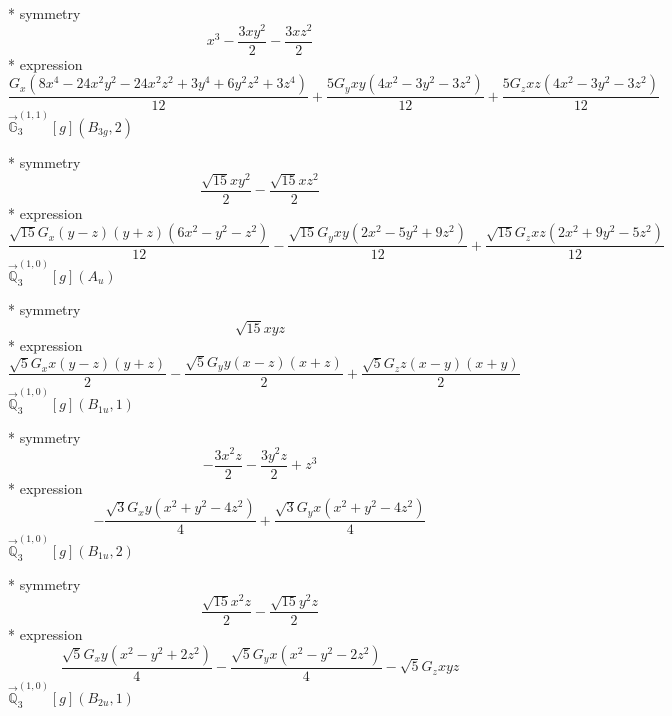 \documentclass[fleqn,8pt]{jsarticle}
\begin{document}
\noindent\quad ** symmetry
\begin{dmath*}
x^{3} - \frac{3 x y^{2}}{2} - \frac{3 x z^{2}}{2}
\end{dmath*}
\noindent\quad ** expression
\begin{dmath*}
\frac{G_{x} \left(8 x^{4} - 24 x^{2} y^{2} - 24 x^{2} z^{2} + 3 y^{4} + 6 y^{2} z^{2} + 3 z^{4}\right)}{12} + \frac{5 G_{y} x y \left(4 x^{2} - 3 y^{2} - 3 z^{2}\right)}{12} + \frac{5 G_{z} x z \left(4 x^{2} - 3 y^{2} - 3 z^{2}\right)}{12}
\end{dmath*}
\noindent\quad $\vec{\mathbb{G}}_{3}^{(1,1)}[g](B_{3g},2)$

\noindent\quad ** symmetry
\begin{dmath*}
\frac{\sqrt{15} x y^{2}}{2} - \frac{\sqrt{15} x z^{2}}{2}
\end{dmath*}
\noindent\quad ** expression
\begin{dmath*}
\frac{\sqrt{15} G_{x} \left(y - z\right) \left(y + z\right) \left(6 x^{2} - y^{2} - z^{2}\right)}{12} - \frac{\sqrt{15} G_{y} x y \left(2 x^{2} - 5 y^{2} + 9 z^{2}\right)}{12} + \frac{\sqrt{15} G_{z} x z \left(2 x^{2} + 9 y^{2} - 5 z^{2}\right)}{12}
\end{dmath*}
\noindent\quad $\vec{\mathbb{Q}}_{3}^{(1,0)}[g](A_{u})$

\noindent\quad ** symmetry
\begin{dmath*}
\sqrt{15} x y z
\end{dmath*}
\noindent\quad ** expression
\begin{dmath*}
\frac{\sqrt{5} G_{x} x \left(y - z\right) \left(y + z\right)}{2} - \frac{\sqrt{5} G_{y} y \left(x - z\right) \left(x + z\right)}{2} + \frac{\sqrt{5} G_{z} z \left(x - y\right) \left(x + y\right)}{2}
\end{dmath*}
\noindent\quad $\vec{\mathbb{Q}}_{3}^{(1,0)}[g](B_{1u},1)$

\noindent\quad ** symmetry
\begin{dmath*}
- \frac{3 x^{2} z}{2} - \frac{3 y^{2} z}{2} + z^{3}
\end{dmath*}
\noindent\quad ** expression
\begin{dmath*}
- \frac{\sqrt{3} G_{x} y \left(x^{2} + y^{2} - 4 z^{2}\right)}{4} + \frac{\sqrt{3} G_{y} x \left(x^{2} + y^{2} - 4 z^{2}\right)}{4}
\end{dmath*}
\noindent\quad $\vec{\mathbb{Q}}_{3}^{(1,0)}[g](B_{1u},2)$

\noindent\quad ** symmetry
\begin{dmath*}
\frac{\sqrt{15} x^{2} z}{2} - \frac{\sqrt{15} y^{2} z}{2}
\end{dmath*}
\noindent\quad ** expression
\begin{dmath*}
\frac{\sqrt{5} G_{x} y \left(x^{2} - y^{2} + 2 z^{2}\right)}{4} - \frac{\sqrt{5} G_{y} x \left(x^{2} - y^{2} - 2 z^{2}\right)}{4} - \sqrt{5} G_{z} x y z
\end{dmath*}
\noindent\quad $\vec{\mathbb{Q}}_{3}^{(1,0)}[g](B_{2u},1)$
\end{document}
